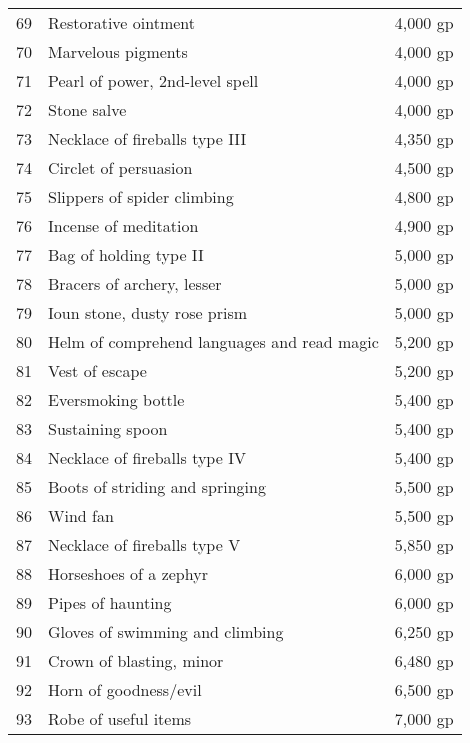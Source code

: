 \begin{table}[]
\begin{tabularx}{\linewidth}{lXl}
69  & Restorative ointment                        & 4,000 gp     \\
70  & Marvelous pigments                          & 4,000 gp     \\
71  & Pearl of power, 2nd-level spell             & 4,000 gp     \\
72  & Stone salve                                 & 4,000 gp     \\
73  & Necklace of fireballs type III              & 4,350 gp     \\
74  & Circlet of persuasion                       & 4,500 gp     \\
75  & Slippers of spider climbing                 & 4,800 gp     \\
76  & Incense of meditation                       & 4,900 gp     \\
77  & Bag of holding type II                      & 5,000 gp     \\
78  & Bracers of archery, lesser                  & 5,000 gp     \\
79  & Ioun stone, dusty rose prism                & 5,000 gp     \\
80  & Helm of comprehend languages and read magic & 5,200 gp     \\
81  & Vest of escape                              & 5,200 gp     \\
82  & Eversmoking bottle                          & 5,400 gp     \\
83  & Sustaining spoon                            & 5,400 gp     \\
84  & Necklace of fireballs type IV               & 5,400 gp     \\
85  & Boots of striding and springing             & 5,500 gp     \\
86  & Wind fan                                    & 5,500 gp     \\
87  & Necklace of fireballs type V                & 5,850 gp     \\
88  & Horseshoes of a zephyr                      & 6,000 gp     \\
89  & Pipes of haunting                           & 6,000 gp     \\
90  & Gloves of swimming and climbing             & 6,250 gp     \\
91  & Crown of blasting, minor                    & 6,480 gp     \\
92  & Horn of goodness/evil                       & 6,500 gp     \\
93  & Robe of useful items                        & 7,000 gp     \\

\end{tabularx}
\end{table}
